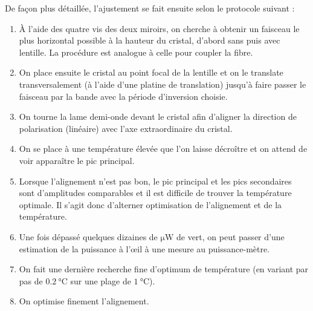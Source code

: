 \documentclass[11pt,a4paper]{article}
\begin{document}
De façon plus détaillée, l'ajustement se fait ensuite selon le protocole suivant :
\begin{enumerate}
	\item À l'aide des quatre vis des deux miroirs, on cherche à obtenir un faisceau le plus horizontal possible à la hauteur du cristal, d'abord sans puis avec lentille. La procédure est analogue à celle pour coupler la fibre.
	\item On place ensuite le cristal au point focal de la lentille et on le translate transversalement (à l'aide d'une platine de translation) jusqu'à faire passer le faisceau par la bande avec la période d'inversion choisie.
	\item On tourne la lame demi-onde devant le cristal afin d'aligner la direction de polarisation (linéaire) avec l'axe extraordinaire du cristal.
	\item On se place à une température élevée que l'on laisse décroître et on attend de voir apparaître le pic principal.
	\item Lorsque l'alignement n'est pas bon, le pic principal et les pics secondaires sont d'amplitudes comparables et il est difficile de trouver la température optimale. Il s'agit donc d'alterner optimisation de l'alignement et de la température.
	\item Une fois dépassé quelques dizaines de $\unit{\micro\watt}$ de vert, on peut passer d'une estimation de la puissance à l'\oe il à une mesure au puissance-mètre.
	\item On fait une dernière recherche fine d'optimum de température (en variant par pas de $\SI{0.2}{\celsius}$ sur une plage de $\SI{1}{\celsius}$).
	\item On optimise finement l'alignement. %
\end{enumerate}





\end{document}
